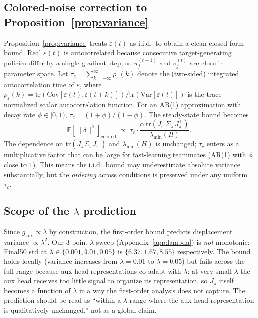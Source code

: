 \documentclass{article}
\theoremstyle{plain}
\theoremstyle{definition}
\theoremstyle{remark}
\begin{document}
\subsection{Colored-noise correction to Proposition~\ref{prop:variance}}
\label{app:theory_colored}

Proposition~\ref{prop:variance} treats $\varepsilon(t)$ as i.i.d.\
to obtain a clean closed-form bound. Real $\varepsilon(t)$ is
autocorrelated because consecutive target-generating policies
differ by a single gradient step, so $\pi_j^{(t+1)}$ and
$\pi_j^{(t)}$ are close in parameter space. Let $\tau_c = \sum_{k=-\infty}^{\infty}
\rho_\varepsilon(k)$ denote the (two-sided) integrated autocorrelation
time of $\varepsilon$, where $\rho_\varepsilon(k) = \mathrm{tr}(\mathrm{Cov}[\varepsilon(t),
\varepsilon(t+k)]) / \mathrm{tr}(\mathrm{Var}[\varepsilon(t)])$ is
the trace-normalized scalar autocorrelation function. For an AR(1)
approximation with decay rate $\phi \in [0,1)$, $\tau_c =
(1+\phi)/(1-\phi)$. The steady-state bound becomes
\begin{equation}
    \mathbb{E}[\|\delta\|^2]_{\mathrm{colored}}
    \;\propto\;
    \tau_c \cdot
    \frac{\alpha \,\mathrm{tr}(J_\pi \,\Sigma_\pi\, J_\pi^\top)}
         {\lambda_{\min}(H)}.
    \label{eq:colored_bound}
\end{equation}
The dependence on $\mathrm{tr}(J_\pi \Sigma_\pi J_\pi^\top)$ and
$\lambda_{\min}(H)$ is unchanged; $\tau_c$ enters as a
multiplicative factor that can be large for fast-learning teammates
(AR(1) with $\phi$ close to $1$). This means the i.i.d.\ bound may
underestimate absolute variance substantially, but the
\emph{ordering} across conditions is preserved under any uniform
$\tau_c$.

\subsection{Scope of the $\lambda$ prediction}
\label{app:theory_lambda_scope}

Since $g_{\mathrm{aux}} \propto \lambda$ by construction, the
first-order bound predicts displacement variance $\propto \lambda^2$.
Our 3-point $\lambda$ sweep (Appendix~\ref{app:lambda}) is
\emph{not} monotonic: Final50 std at $\lambda \in \{0.001, 0.01,
0.05\}$ is $\{6.37, 1.67, 8.55\}$ respectively. The bound holds
locally (variance increases from $\lambda = 0.01$ to $\lambda =
0.05$) but fails across the full range because aux-head
representations co-adapt with $\lambda$: at very small $\lambda$
the aux head receives too little signal to organize its
representation, so $J_\pi$ itself becomes a function of $\lambda$
in a way the first-order analysis does not capture. The prediction
should be read as ``within a $\lambda$ range where the aux-head
representation is qualitatively unchanged,'' not as a global claim.
\end{document}
